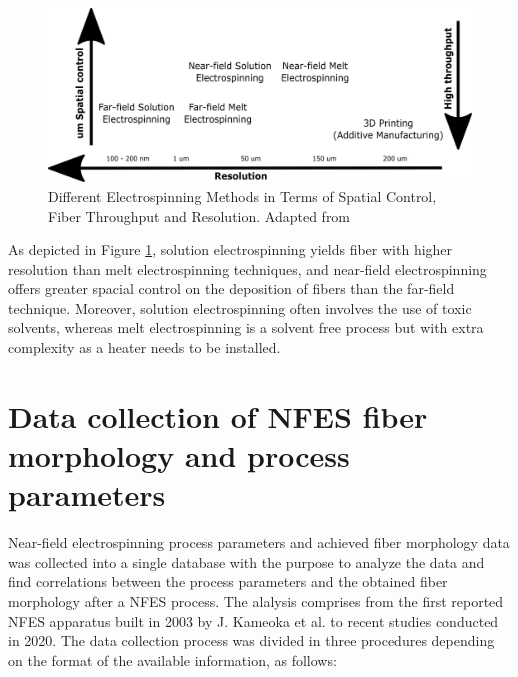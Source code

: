 \begin{figure}[!th]
\centering
\includegraphics[scale=0.45]{./Figures/DifferentElectrospinningMethods.png}
\decoRule
\caption[Different Electrospinning Methods in Terms of Spatial Control, Fiber Throughput and Resolution]{Different Electrospinning Methods in Terms of Spatial Control, Fiber Throughput and Resolution. Adapted from \cite{Tourlomousis2017}}
\label{fig:DifferentElectrospinningMethods}
\end{figure}

As depicted in Figure \ref{fig:DifferentElectrospinningMethods}, solution electrospinning yields fiber with higher resolution than melt electrospinning techniques, and near-field electrospinning offers greater spacial control on the deposition of fibers than the far-field technique. Moreover, solution electrospinning often involves the use of toxic solvents, whereas melt electrospinning is a solvent free process but with extra complexity as a heater needs to be installed. \cite{Tourlomousis2017}

\section{Data collection of NFES fiber morphology and process parameters}

Near-field electrospinning process parameters and achieved fiber morphology data was collected into a single database with the purpose to analyze the data and find correlations between the process parameters and the obtained fiber morphology after a NFES process. The alalysis comprises from the first reported NFES apparatus built in 2003 by J. Kameoka et al. \cite{Kameoka2003a} to recent studies conducted in 2020. \cite{
  Yang2019,Fattahi2017,Shin2019,Wang2015,Parajuli2016,Zheng2010,Fuh2011,Dalton2015,
  Ru2014,Xue2014,Wang2017,Xu2014,Liu2013,Pan2014,Canton2014,Chakraborty2009,Gupta2007,
  He2018,Zhou2011,Chen2013,Williams2018,Choi2017,Pan2019,Lei2015,Lim2019,Park2020,
  Fuh2012,Flores2017,Chang2010,Xu2019,Zhang2019,Shin2018,Fuh2015,Nagle2019,Zheng2012,
  Kameoka2003a,Liu2014,E.King2019,Hochleitner2017,Madou2011,Jiang2018,Husain2016,
  ElectrospinTech2015,Brown2011,Kolan2018,Chang2011,Beachley2011,Camillo2013,Kameoka2003,
  Bu2012,Lee2012,Huang2015,Coppola2020,CisquellaSerra2019,Ruggieri2013,Hochleitner2014,
  Zhu2016,Brown2014,Chang2008,Sonntag2020,Kim2018,Deng2020,Han2019,George2020,Sun2006a,
  Pan2015,Shen2016,Strauss2019,Fuh2013,Sarkar2007,You2017,Wang2018a,Zheng2014,Song2015,
  GaofengZheng2010,Liu2015a,Min2013,Luo2016,Yousefi2019,Cardenas2017,Coppola2014} The data collection process was divided in three procedures depending on the format of the available information, as follows:

